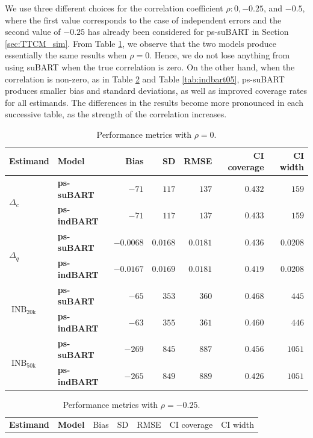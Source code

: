 \documentclass[aoas,preprint]{imsart}
\theoremstyle{plain}
\theoremstyle{definition}
\theoremstyle{remark}
\begin{document}
\begin{appendix}
We use three different choices for the correlation coefficient $\rho\colon 0, -0.25$, and $-0.5$, where the first value corresponds to the case of independent errors and the second value of $-0.25$ has already been considered for ps-suBART in Section \ref{sec:TTCM_sim}. 
From Table \ref{tab:indbart0}, we observe that the two models produce essentially the same results when $\rho = 0$. Hence, we do not lose anything from using suBART when the true correlation is zero. On the other hand, when the correlation is non-zero, as in Table \ref{tab:indbart025} and Table \ref{tab:indbart05}, ps-suBART produces smaller bias and standard deviations, as well as improved coverage rates for all estimands. 
The differences in the results become more pronounced in each successive table, as the strength of the correlation increases.
\begin{table}[H]
\caption{Performance metrics with $\rho = 0$.\label{tab:indbart0}}
\setlength{\tabcolsep}{3.75pt}
\begin{tabular}{ll|rrrrr}
\textbf{Estimand} & \textbf{Model} & Bias & SD & RMSE & CI coverage & CI width \\
\hline
\multirow{2}{*}{$\Delta_c$} & \textbf{ps-suBART} & $-71$& $117$& $137$& $0.432$& $159$ \\
&\textbf{ps-indBART}& $-71$& $117$& $137$& $0.433$& $159$ \\
\multirow{2}{*}{$\Delta_q$} & \textbf{ps-suBART} & $-0.0068$& $0.0168$& $0.0181$& $0.436$& $0.0208$ \\
& \textbf{ps-indBART} & $-0.0167$& $0.0169$& $0.0181$& $0.419$& $0.0208$\\
\multirow{2}{*}{$\operatorname{INB}_{\mathrm{20k}}$} & \textbf{ps-suBART} & $-65$& $353$& $360$& $0.468$& $445$ \\
& \textbf{ps-indBART} & $-63$& $355$& $361$& $0.460$& $446$ \\
\multirow{2}{*}{$\operatorname{INB}_{\mathrm{50k}}$} & \textbf{ps-suBART} & $-269$ & $845$& $887$& $0.456$& $1051$ \\
& \textbf{ps-indBART} & $-265$& $849$& $889$& $0.426$& $1051$
\end{tabular}
\end{table}%
\begin{table}[H]
\caption{Performance metrics with $\rho = -0.25$.\label{tab:indbart025}}
\setlength{\tabcolsep}{3.75pt}
\begin{tabular}{ll|rrrrr}
\textbf{Estimand} & \textbf{Model} & Bias & SD & RMSE & CI coverage & CI width \\

\end{tabular}
\end{table}
\end{appendix}
\end{document}
